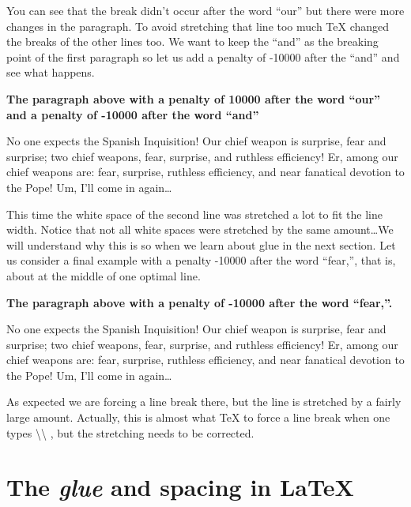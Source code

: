 \documentclass[a4paper]{article}
\newcommand{\bs}[1]{{\rmfamily\color{blue}\textbackslash{}#1}}
\newenvironment{example}[1]{%
\vspace{10pt}
\noindent\textbf{#1}\sffamily\par\vspace{10pt}%
}
{%
\par\vspace{10pt}
}
\begin{document}
\noindent You can see that the break didn't occur after the word ``our'' but there were more changes in the paragraph. To avoid stretching that line too much \TeX{} changed the breaks of the other lines too. We want to keep the ``and'' as the breaking point of the first paragraph so let us add a penalty of -10000 after the ``and'' and see what happens.

\begin{example}{The paragraph above with a penalty of 10000 after the word ``our'' and a penalty of -10000 after the word ``and''}
No one expects the Spanish Inquisition! Our chief weapon is surprise, fear and{} surprise; two chief weapons, fear, surprise, and ruthless efficiency! Er, among our{} chief weapons are: fear, surprise, ruthless efficiency, and near fanatical devotion to the Pope! Um, I'll come in again\dots
\end{example}

\noindent This time the white space of the second line was stretched a lot to fit the line width. Notice that not all white spaces were stretched by the same amount\dots We will understand why this is so when we learn about glue in the next section. Let us consider a final example with a penalty -10000 after the word ``fear,'', that is, about at the middle of one optimal line.

\begin{example}{The paragraph above with a penalty of -10000 after the word ``fear,''.}
No one expects the Spanish Inquisition! Our chief weapon is surprise, fear and surprise; two chief weapons, fear,{} surprise, and ruthless efficiency! Er, among our chief weapons are: fear, surprise, ruthless efficiency, and near fanatical devotion to the Pope! Um, I'll come in again\dots
\end{example}

\noindent As expected we are forcing a line break there, but the line is stretched by a fairly large amount. Actually, this is almost what \TeX{} to force a line break when one types \bs{\bs{ }}, but the stretching needs to be corrected.

\section{The \emph{glue} and spacing in \LaTeX}
\end{document}
